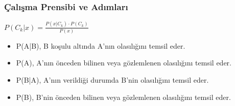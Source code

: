 \subsubsection{Çalışma Prensibi ve Adımları}
$P(C_k | x) = \frac{P(x | C_k) \cdot P(C_k)}{P(x)}$
\begin{itemize}
\item P(A|B), B koşulu altında A'nın olasılığını temsil eder.
\item P(A), A'nın önceden bilinen veya gözlemlenen olasılığını temsil eder.
\item P(B|A), A'nın verildiği durumda B'nin olasılığını temsil eder.
\item P(B), B'nin önceden bilinen veya gözlemlenen olasılığını temsil eder.
\end{itemize}

\newpage
